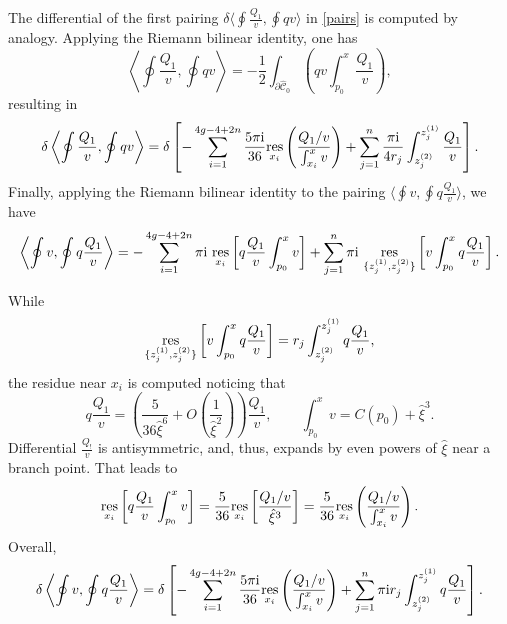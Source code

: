 \documentclass[pdftex]{sigma}
\numberwithin{equation}{section}
\theoremstyle{definition}
\begin{document}
The differential of the first pairing $\delta\big\langle \oint \frac{Q_1}{v}, \oint {qv}\big\rangle $ in \eqref{pairs} is computed by analogy. Applying the Riemann bilinear identity, one has
\begin{equation*}\left\langle \oint \frac{Q_1}{v},\oint {qv}\right\rangle =-\frac{1}{2}\int_{\partial \hat{\mathcal{C}}_0}\left( qv
\int^x_{p_0} \frac{Q_1}{v}\right), \end{equation*}
resulting in
\begin{equation}\label{pt2}
\delta\left\langle \oint \frac{Q_1}{v},\oint {qv}\right\rangle =\delta \left[-\sum^{4g-4+2n}_{i=1} \frac{5 \pi{\rm i}}{36}\underset{x_i}{\rm res}\left(\frac{Q_1/v}{\int^x_{x_i}v} \right)+\sum^{n}_{j=1}\frac{\pi{\rm i}}{4{r}_j}\int^{{z}^{(1)}_j}_{{z}^{(2)}_j}\frac{Q_1}{v}\right].
\end{equation}
Finally, applying the Riemann bilinear identity to the pairing $\big\langle \oint v, \oint q\frac{Q_1}{v}\big\rangle $, we have
\begin{equation*}%
\left\langle \oint v, \oint q\frac{Q_1}{v}\right\rangle =-\sum^{4g-4+2n}_{i=1}\pi{\rm i} \ \underset{x_i}{\rm res}\left[q \frac{Q_1}{v} \int^x_{p_0} v\right]+\sum^{n}_{j=1}\pi{\rm i} \ \underset{\{z^{(1)}_j, z^{(2)}_j \}}{\rm res}\left[v \int^x_{p_0} q\frac{Q_1}{v}\right].\end{equation*}

While
\begin{equation*}%
\underset{\{z^{(1)}_j, z^{(2)}_j \}}{\rm res}\left[v \int^x_{p_0} q\frac{Q_1}{v}\right]=r_j\int^{z^{(1)}_j}_{z^{(2)}_j} q\frac{Q_1}{v},\end{equation*}
the residue near $x_i$ is computed noticing that
\begin{equation*}%
q \frac{Q_1}{v}=\left(\frac{5}{36\hat{\xi}^6}+O\left(\frac{1}{\hat{\xi}^2}\right) \right)\frac{Q_1}{v}, \qquad \int^x_{p_0}v=C(p_0)+{\hat{\xi}^3} .\end{equation*}
Differential $\frac{Q_!}{v}$ is antisymmetric, and, thus, expands by even powers of $\hat{\xi}$ near a branch point. That leads to
\begin{equation*}%
\underset{x_i}{\rm res}\left[q \frac{Q_1}{v} \int^x_{p_0} v\right]=\frac{5}{36}\underset{x_i}{\rm res}\left[\frac{Q_1/v}{\hat{\xi}^3} \right]=\frac{5}{36}\underset{x_i}{\rm res}\left(\frac{Q_1/v}{\int^x_{x_i}v} \right).\end{equation*}
Overall,
\begin{equation}\label{pt3}\delta\left\langle \oint v, \oint q\frac{Q_1}{v}\right\rangle =\delta \left[-\sum^{4g-4+2n}_{i=1} \frac{5 \pi{\rm i}}{36}\underset{x_i}{\rm res}\left(\frac{Q_1/v}{\int^x_{x_i}v} \right)+\sum^{n}_{j=1}\pi{\rm i} r_j\int^{z^{(1)}_j}_{z^{(2)}_j} q\frac{Q_1}{v}\right].\end{equation}
\end{document}
